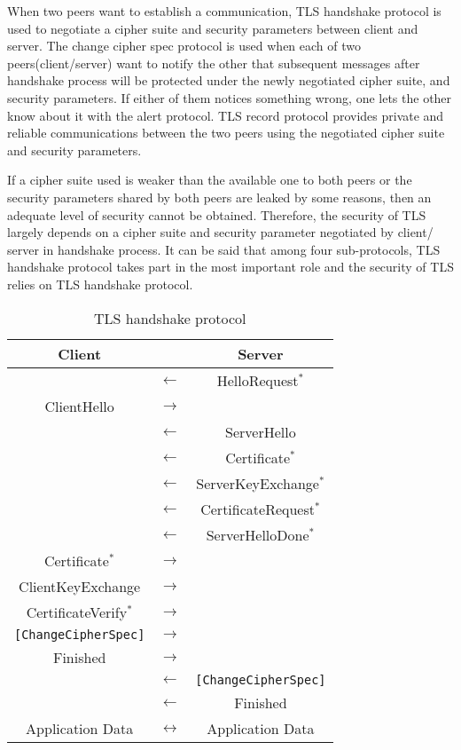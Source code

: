 \documentclass[a4paper,fleqn]{cas-dc}
\begin{document}
When two peers want to establish a communication, TLS handshake protocol is used to negotiate a cipher suite and security parameters between client and server. The change cipher spec protocol is used when each of two peers(client/server) want to notify the other that subsequent messages after handshake process will be protected under the newly negotiated cipher suite, and security parameters. If either of them notices something wrong, one lets the other know about it with the alert protocol. TLS record protocol provides private and reliable communications between the two peers using the negotiated cipher suite and security parameters.

If a cipher suite used is weaker than the available one to both peers or the security parameters shared by both peers are leaked by some reasons, then an adequate level of security cannot be obtained. Therefore, the security of TLS largely depends on a cipher suite and security parameter negotiated by client/ server in handshake process. It can be said that among four sub-protocols, TLS handshake protocol takes part in the most important role and the security of TLS relies on TLS handshake protocol. 

\begin{table}[]
\centering
    \begin{tabular}{ c c c }
    Client &  & Server \\ 
    \hline
    & $\leftarrow$ & HelloRequest$^*$ \\  
    ClientHello & $\rightarrow$ & \\ 
    & $\leftarrow$ & ServerHello \\  
    & $\leftarrow$ & Certificate$^*$ \\  
    & $\leftarrow$ & ServerKeyExchange$^*$ \\  
    & $\leftarrow$ & CertificateRequest$^*$ \\  
    & $\leftarrow$ & ServerHelloDone$^*$ \\  
    Certificate$^*$ & $\rightarrow$ & \\ 
    ClientKeyExchange & $\rightarrow$ & \\ 
    CertificateVerify$^*$ & $\rightarrow$ & \\ 
    \verb![ChangeCipherSpec]! & $\rightarrow$ & \\ 
    Finished & $\rightarrow$ & \\ 
    & $\leftarrow$ & \verb![ChangeCipherSpec]! \\  
    & $\leftarrow$ & Finished \\ 
    Application Data & $\leftrightarrow$ & Application Data \\ 
    \end{tabular}
    \caption{TLS handshake protocol}
    \label{tab:tb1}
\end{table}
\end{document}
